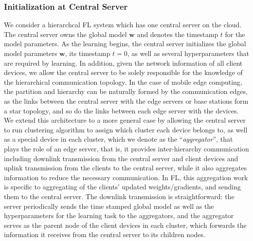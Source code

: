 \documentclass[10pt,twocolumn,letterpaper]{article}
\theoremstyle{definition}
\begin{document}
\subsubsection{Initialization at Central Server}%
We consider a hierarchcal FL system which has one central server on the cloud. The central server owns the global model $\mathbf{w}$ and denotes the timestamp $t$ for the model parameters. 
As the learning begins, the central server initializes the global model parameters $\mathbf{w}$, its timestamp $t=0$, as well as several hyperparameters that are required by learning. 
In addition, given the network information of all client devices, we allow the central server to be solely responsible for the knowledge of the hierarchical communication topology. 
In the case of mobile edge computing, the partition and hierarchy can be naturally formed by the communication edges, as the links between the central server with the edge servers or base stations form a star topology, and so do the links between each edge server with the devices. We extend this architecture to a more general case by allowing the central server to run clustering algorithm to assign which cluster each device belongs to, as well as a special device in each cluster, which we denote as the ``\textit{aggregator}'', that plays the role of an edge server, that is, it provides inter-hierarchy communication including downlink transmission from the central server and client devices and uplink transmission from the clients to the central server, while it also aggregates information to reduce the necessary communication. In FL, this aggregation work is specific to aggregating of the clients' updated weights/gradients, and sending them to the central server. The downlink transmission is straightforward: the server periodically sends the time stamped global model as well as the hyperparameters for the learning task to the aggregators, and the aggregator serves as the parent node of the client devices in each cluster, which forwards the information it receives from the central server to its children nodes.
\end{document}
